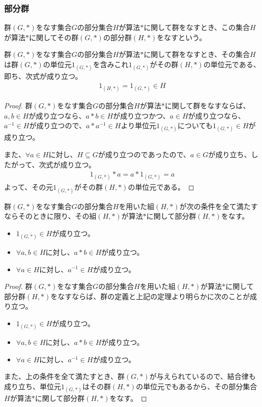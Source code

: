 \documentclass[dvipdfmx]{jsarticle}
\begin{document}
\subsubsection{部分群}%
\begin{dfn}
群$(G,*)$をなす集合$G$の部分集合$H$が算法$*$に関して群をなすとき、この集合$H$が算法$*$に関してその群$(G,*)$の部分群$(H,*)$をなすという。
\end{dfn}
\begin{thm}\label{3.1.1.5}
群$(G,*)$をなす集合$G$の部分集合$H$が算法$*$に関して群をなすとき、その集合$H$は群$(G,*)$の単位元$1_{(G,*)}$を含みこれ$1_{(G,*)}$がその群$(H,*)$の単位元である、即ち、次式が成り立つ。
\begin{align*}
1_{(H,*)} = 1_{(G,*)} \in H
\end{align*}
\end{thm}
\begin{proof}
群$(G,*)$をなす集合$G$の部分集合$H$が算法$*$に関して群をなすならば、$a,b \in H$が成り立つなら、$a*b \in H$が成り立つかつ、$a \in H$が成り立つなら、$a^{- 1} \in H$が成り立つので、$a*a^{- 1} \in H$より単位元$1_{(G,*)}$についても$1_{(G,*)} \in H$が成り立つ。\par
また、$\forall a \in H$に対し、$H \subseteq G$が成り立つのであったので、$a \in G$が成り立ち、したがって、次式が成り立つ。
\begin{align*}
1_{(G,*)}*a = a*1_{(G,*)} = a
\end{align*}
よって、その元$1_{(G,*)}$がその群$(H,*)$の単位元である。
\end{proof}
\begin{thm}\label{3.1.1.6}
群$(G,*)$をなす集合$G$の部分集合$H$を用いた組$(H,*)$が次の条件を全て満たすならそのときに限り、その組$(H,*)$が算法$*$に関して部分群$(H,*)$をなす。
\begin{itemize}
\item
  $1_{(G,*)} \in H$が成り立つ。
\item
  $\forall a,b \in H$に対し、$a*b \in H$が成り立つ。
\item
  $\forall a \in H$に対し、$a^{- 1} \in H$が成り立つ。
\end{itemize}
\end{thm}
\begin{proof}
群$(G,*)$をなす集合$G$の部分集合$H$を用いた組$(H,*)$が算法$*$に関して部分群$(H,*)$をなすならば、群の定義と上記の定理より明らかに次のことが成り立つ。
\begin{itemize}
\item
  $1_{(G,*)} \in H$が成り立つ。
\item
  $\forall a,b \in H$に対し、$a*b \in H$が成り立つ。
\item
  $\forall a \in H$に対し、$a^{- 1} \in H$が成り立つ。
\end{itemize}\par
また、上の条件を全て満たすとき、群$(G,*)$が与えられているので、結合律も成り立ち、単位元$1_{(G,*)}$はその群$(H,*)$の単位元でもあるから、その部分集合$H$が算法$*$に関して部分群$(H,*)$をなす。
\end{proof}
\end{document}

